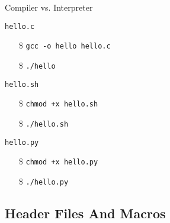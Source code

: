 \begin{frame}{Compiler vs. Interpreter}
  \begin{iblock}{\texttt{hello.c}}
    \begin{minipage}{.4\linewidth}
    \end{minipage}
    \begin{minipage}{.5\linewidth}
      \begin{itemize}
      \item[\$] \texttt{gcc -o hello hello.c}
      \item[\$] \texttt{./hello}
      \end{itemize}
    \end{minipage}
  \end{iblock}
  \begin{iblock}{\texttt{hello.sh}}
    \begin{minipage}{.4\linewidth}
    \end{minipage}
    \begin{minipage}{.5\linewidth}
      \begin{enumerate}
      \item[\$] \texttt{chmod +x hello.sh}
      \item[\$] \texttt{./hello.sh}
      \end{enumerate}
    \end{minipage}
  \end{iblock}
  \begin{iblock}{\texttt{hello.py}}
    \begin{minipage}{.4\linewidth}
    \end{minipage}
    \begin{minipage}{.5\linewidth}
      \begin{enumerate}
      \item[\$] \texttt{chmod +x hello.py}
      \item[\$] \texttt{./hello.py}
      \end{enumerate}
    \end{minipage}
  \end{iblock}
\end{frame}

\subsection{Header Files And Macros}
\label{sec:header-files}

